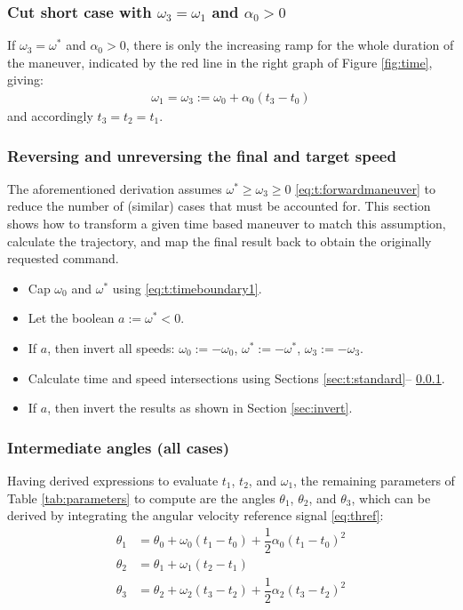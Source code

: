 \documentclass[12pt, a4paper]
{article}
\providecommand{\w}{\omega}
\providecommand{\wt}{\w^*}
\renewcommand{\th}{\theta}
\renewcommand{\a}{\alpha}
\providecommand{\w}{\omega}
\begin{document}
\subsubsection{Cut short case with $\w_3 = \w_1$ and $\a_0 > 0$}
\label{sec:t:cutshortw3}

If $\w_3 = \wt$ and $\a_0 > 0$, there is only the increasing
ramp for the whole duration of the maneuver, indicated by the
red line in the right graph of Figure \ref{fig:time}, giving:
%
\begin{align}
    \w_1 = \w_3 := \w_0 + \a_0(t_3 - t_0)
\end{align}
%
and accordingly $t_3=t_2=t_1$.




\subsubsection{Reversing and unreversing the final and target speed}

\label{sec:t:reversing}
The aforementioned derivation assumes $\wt \geq \w_3 \geq 0$
\eqref{eq:t:forwardmaneuver} to reduce the number of (similar) cases that must
be accounted for. This section shows how to transform a given time based
maneuver to match this assumption, calculate the trajectory, and map the final
result back to obtain the originally requested command.

\begin{itemize}
    \item Cap $\w_0$ and $\wt$ using \eqref{eq:t:timeboundary1}.
    \item Let the boolean $a := \wt < 0$.
    \item If $a$, then invert all speeds: $\w_0 := -\w_0$, $\wt := -\wt$,
        $\w_3 := -\w_3$.
    \item Calculate time and speed intersections using Sections \ref{sec:t:standard}--
    \ref{sec:t:cutshortw3}.
    \item If $a$, then invert the results as shown in Section \ref{sec:invert}.
\end{itemize}


\subsubsection{Intermediate angles (all cases)}

Having derived expressions to evaluate $t_1$, $t_2$, and $\w_1$, the remaining
parameters of Table \ref{tab:parameters} to compute are the angles
$\th_1$, $\th_2$, and $\th_3$, which can be derived by integrating the
angular velocity reference signal \eqref{eq:thref}:
\begin{align}
    \label{eq:t:anglepar1}
    \th_1  &= \th_0  + \w_0(t_1-t_0)+\dfrac{1}{2}\a_0(t_1-t_0)^2\\
    \label{eq:t:anglepar2}
    \th_2&=\th_1+ \w_1(t_2-t_1)\\
    \label{eq:t:anglepar3}
    \th_3  &=\th_2+ \w_2(t_3-t_2)+\dfrac{1}{2}\a_2(t_3-t_2)^2    
\end{align}
%
\end{document}
